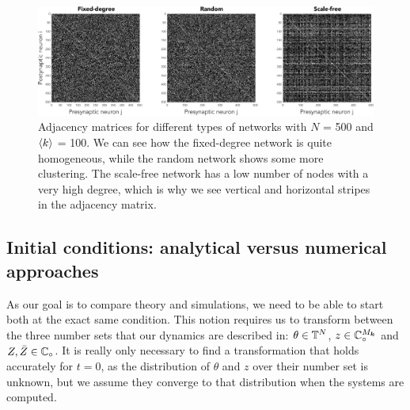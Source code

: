 \begin{figure}[H]
\centering
\includegraphics[width = \textwidth]{../Figures/Adjacency_matrices.pdf}
   \caption{Adjacency matrices for different types of networks with $N$ = 500 and ${\langle k\rangle}$ = 100. We can see how the fixed-degree network is quite homogeneous, while the random network shows some more clustering. The scale-free network has a low number of nodes with a very high degree, which is why we see vertical and horizontal stripes in the adjacency matrix.}
   \label{fig:adjacencymatrices}
\end{figure}



\subsection{Initial conditions: analytical versus numerical approaches} \label{sec:initialconditions}
As our goal is to compare theory and simulations, we need to be able to start both at the exact same condition. This notion requires us to transform between the three number sets that our dynamics are described in: $\theta \in {\mathbb{T}}^N$, $z \in \mathbb{C}_\circ^{M_{{\boldsymbol{k}}}}$ and $Z, \bar{Z} \in \mathbb{C}_\circ$. It is really only necessary to find a transformation that holds accurately for $t=0$, as the distribution of $\theta$ and $z$ over their number set is unknown, but we assume they converge to that distribution when the systems are computed. 



